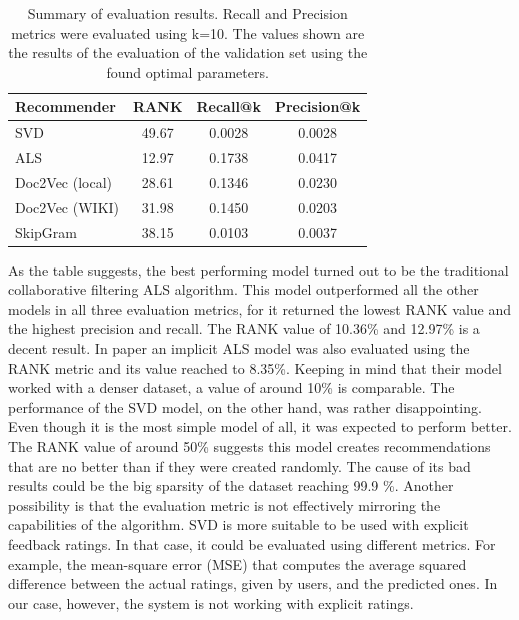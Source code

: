 \begin{table}[]
    \centering
    \begin{tabular}{|l|c|c|c|}
        \hline
        Recommender & \textbf{RANK} & \textbf{Recall@k} & \textbf{Precision@k} \\ \hline
        SVD         & 49.67         & 0.0028            & 0.0028               \\ \hline
        ALS         & 12.97         & 0.1738            & 0.0417               \\ \hline
        Doc2Vec (local)     & 28.61         & 0.1346            & 0.0230               \\ \hline
        Doc2Vec (WIKI)    &   31.98   &   0.1450  &   0.0203    \\ \hline
        SkipGram    & 38.15         & 0.0103            & 0.0037               \\ \hline
    \end{tabular}
    \caption{Summary of evaluation results. Recall and Precision metrics were evaluated using k=10. The values shown are the results of the evaluation of the validation set using the found optimal parameters.}
    \label{tab:summary_vs}
\end{table}

As the table suggests, the best performing model turned out to be the traditional collaborative filtering ALS algorithm. This model outperformed all the other models in all three evaluation metrics, for it returned the lowest RANK value and the highest precision and recall. 
The RANK value of 10.36\% and 12.97\% is a decent result. In paper \cite{Implicit} an implicit ALS model was also evaluated using the RANK metric and its value reached to 8.35\%. Keeping in mind that their model worked with a denser dataset, a value of around 10\% is comparable. The performance of the SVD model, on the other hand, was rather disappointing. Even though it is the most simple model of all, it was expected to perform better. The RANK value of around 50\% suggests this model creates recommendations that are no better than if they were created randomly. 
The cause of its bad results could be the big sparsity of the dataset reaching 99.9 \%. Another possibility is that the evaluation metric is not effectively mirroring the capabilities of the algorithm. SVD is more suitable to be used with explicit feedback ratings. In that case, it could be evaluated using different metrics. For example, the mean-square error (MSE) that computes the average squared difference between the actual ratings, given by users, and the predicted ones. In our case, however, the system is not working with explicit ratings.

